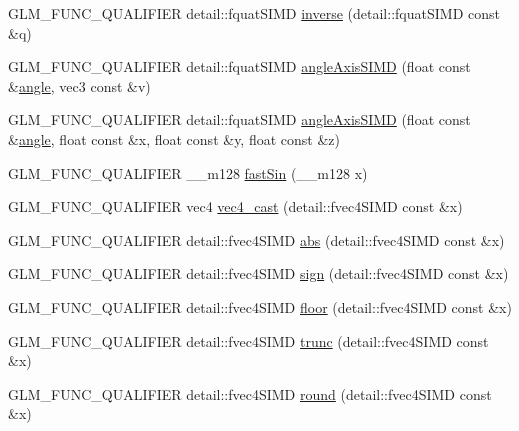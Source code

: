 \begin{DoxyCompactItemize}
\item 
G\+L\+M\+\_\+\+F\+U\+N\+C\+\_\+\+Q\+U\+A\+L\+I\+F\+I\+E\+R detail\+::fquat\+S\+I\+M\+D \hyperlink{namespaceglm_ad723ad1f3ef20438ade0e0c95002f187}{inverse} (detail\+::fquat\+S\+I\+M\+D const \&q)
\item 
G\+L\+M\+\_\+\+F\+U\+N\+C\+\_\+\+Q\+U\+A\+L\+I\+F\+I\+E\+R detail\+::fquat\+S\+I\+M\+D \hyperlink{namespaceglm_a635900a97b69fe25d76c029f130a1c8f}{angle\+Axis\+S\+I\+M\+D} (float const \&\hyperlink{group__gtc__quaternion_gad4a4448baedb198b2b1e7880d2544dc9}{angle}, vec3 const \&v)
\item 
G\+L\+M\+\_\+\+F\+U\+N\+C\+\_\+\+Q\+U\+A\+L\+I\+F\+I\+E\+R detail\+::fquat\+S\+I\+M\+D \hyperlink{namespaceglm_a8ae8890bd658ce7217abc2112e3dca35}{angle\+Axis\+S\+I\+M\+D} (float const \&\hyperlink{group__gtc__quaternion_gad4a4448baedb198b2b1e7880d2544dc9}{angle}, float const \&x, float const \&y, float const \&z)
\item 
G\+L\+M\+\_\+\+F\+U\+N\+C\+\_\+\+Q\+U\+A\+L\+I\+F\+I\+E\+R \+\_\+\+\_\+m128 \hyperlink{namespaceglm_a81de908720e51f26e86e18d37aa5cc3b}{fast\+Sin} (\+\_\+\+\_\+m128 x)
\item 
G\+L\+M\+\_\+\+F\+U\+N\+C\+\_\+\+Q\+U\+A\+L\+I\+F\+I\+E\+R vec4 \hyperlink{namespaceglm_a8fd3f484b1badc1724ab65dc9714ad6c}{vec4\+\_\+cast} (detail\+::fvec4\+S\+I\+M\+D const \&x)
\item 
G\+L\+M\+\_\+\+F\+U\+N\+C\+\_\+\+Q\+U\+A\+L\+I\+F\+I\+E\+R detail\+::fvec4\+S\+I\+M\+D \hyperlink{namespaceglm_a68109cc8f5b3e44fd65707fac87fb4d5}{abs} (detail\+::fvec4\+S\+I\+M\+D const \&x)
\item 
G\+L\+M\+\_\+\+F\+U\+N\+C\+\_\+\+Q\+U\+A\+L\+I\+F\+I\+E\+R detail\+::fvec4\+S\+I\+M\+D \hyperlink{namespaceglm_af67d3ef2ca567fe890c09a8fa26328bf}{sign} (detail\+::fvec4\+S\+I\+M\+D const \&x)
\item 
G\+L\+M\+\_\+\+F\+U\+N\+C\+\_\+\+Q\+U\+A\+L\+I\+F\+I\+E\+R detail\+::fvec4\+S\+I\+M\+D \hyperlink{namespaceglm_a96b854694bd3ae049376cbdba57f2599}{floor} (detail\+::fvec4\+S\+I\+M\+D const \&x)
\item 
G\+L\+M\+\_\+\+F\+U\+N\+C\+\_\+\+Q\+U\+A\+L\+I\+F\+I\+E\+R detail\+::fvec4\+S\+I\+M\+D \hyperlink{namespaceglm_a9209720f29f7ce2e879af12191051927}{trunc} (detail\+::fvec4\+S\+I\+M\+D const \&x)
\item 
G\+L\+M\+\_\+\+F\+U\+N\+C\+\_\+\+Q\+U\+A\+L\+I\+F\+I\+E\+R detail\+::fvec4\+S\+I\+M\+D \hyperlink{namespaceglm_ac38130a4224e740980925150ea8dae5e}{round} (detail\+::fvec4\+S\+I\+M\+D const \&x)
\item 

\end{DoxyCompactItemize}
